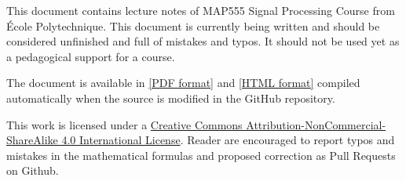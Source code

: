 This document contains lecture notes of MAP555 Signal Processing
Course from École Polytechnique. This document is currently being written and should be considered
unfinished and full of mistakes and typos. It should not be used yet as a
pedagogical support for a course. 

The document is available in \href{https://rflamary.github.io/map555-signal-processing/poly.pdf}{[PDF
format]} and \href{https://rflamary.github.io/map555-signal-processing/}{[HTML
format]} compiled automatically when the source is modified in the GitHub repository.

This work is licensed under a
\href{http://creativecommons.org/licenses/by-nc-sa/4.0/}{Creative Commons
Attribution-NonCommercial-ShareAlike 4.0 International License}. Reader are
encouraged to report typos and mistakes in the mathematical formulas and
proposed correction as Pull Requests on Github.


